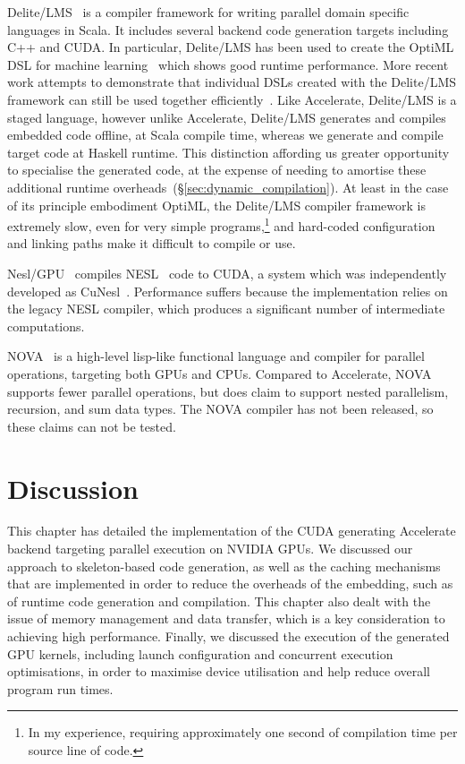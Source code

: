 Delite/LMS~\cite{Rompf:2013er} is a compiler framework for writing parallel
domain specific languages in Scala. It includes several backend code generation
targets including C++ and CUDA\@. In particular, Delite/LMS has been used to
create the OptiML DSL for machine learning~\cite{Sujeeth:2011ti} which shows
good runtime performance. More recent work attempts to demonstrate that
individual DSLs created with the Delite/LMS framework can still be used together
efficiently~\cite{Sujeeth:2013jv}. Like Accelerate, Delite/LMS is a staged
language, however unlike Accelerate, Delite/LMS generates and compiles embedded
code offline, at Scala compile time, whereas we generate and compile target code
at Haskell runtime. This distinction affording us greater opportunity to
specialise the generated code, at the expense of needing to amortise these
additional runtime overheads~(\S\ref{sec:dynamic_compilation}). At least in the
case of its principle embodiment OptiML, the Delite/LMS compiler framework is
extremely slow, even for very simple programs,\footnote{In my experience,
requiring approximately one second of compilation time per source line of code.}
and hard-coded configuration and linking paths make it difficult to compile or
use.

Nesl/GPU~\cite{Bergstrom:2012bi} compiles NESL~\cite{Blelloch:1995ut} code to
CUDA, a system which was independently developed as CuNesl~\cite{Zhang:2012jl}.
Performance suffers because the implementation relies on the legacy NESL
compiler, which produces a significant number of intermediate computations.

NOVA~\cite{Collins:2013wn} is a high-level lisp-like functional language and
compiler for parallel operations, targeting both GPUs and CPUs. Compared to
Accelerate, NOVA supports fewer parallel operations, but does claim to support
nested parallelism, recursion, and sum data types. The NOVA compiler has not
been released, so these claims can not be tested.


\section{Discussion}

This chapter has detailed the implementation of the CUDA generating Accelerate
backend targeting parallel execution on NVIDIA GPUs. We discussed our approach
to skeleton-based code generation, as well as the caching mechanisms that are
implemented in order to reduce the overheads of the embedding, such as of
runtime code generation and compilation. This chapter also dealt with the issue
of memory management and data transfer, which is a key consideration to
achieving high performance. Finally, we discussed the execution of the generated
GPU kernels, including launch configuration and concurrent execution
optimisations, in order to maximise device utilisation and help reduce overall
program run times.

